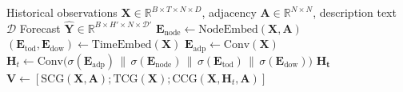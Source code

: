 \begin{algorithm}[H]
\caption{Vision-enhanced Spatio-Temporal Forecasting}
\label{alg:vist}
\begin{algorithmic}[1]
    \REQUIRE Historical observations $\mathbf{X}\!\in\!\mathbb{R}^{B\times T\times N\times D}$,
             adjacency $\mathbf{A}\!\in\!\mathbb R^{N\times N}$,
             description text $\mathcal{D}$
    \ENSURE  Forecast $\widehat{\mathbf{Y}}\!\in\!\mathbb R^{B\times H'\times N\times \mathcal{D}'}$
        \STATE $\mathbf{E}_{\text{node}}\leftarrow\text{NodeEmbed}(\mathbf{X,A})$
        \STATE $(\mathbf{E}_{\text{tod}},\mathbf{E}_{\text{dow}})\leftarrow\text{TimeEmbed}(\mathbf{X})$
        \STATE $\mathbf{E}_{\text{adp}}\leftarrow\text{Conv}(\mathbf{X})$
        \STATE $\mathbf{H}_t\!\leftarrow\!\text{Conv}\bigl(
               \sigma(\mathbf{E}_{\text{adp}})
               \,\|\,\sigma(\mathbf{E}_{\text{node}})
               \,\|\,\sigma(\mathbf{E}_{\text{tod}})
               \,\|\,\sigma(\mathbf{E}_{\text{dow}})
               \bigr)$
        \RETURN $\mathbf{H_t}$
        \STATE $\mathbf{V}\leftarrow [\text{SCG}(\mathbf{X},\mathbf{A});\text{TCG}(\mathbf{X});\text{CCG}(\mathbf{X},\mathbf{H}_t,\mathbf{A})]$
        

\end{algorithmic}
\end{algorithm}
